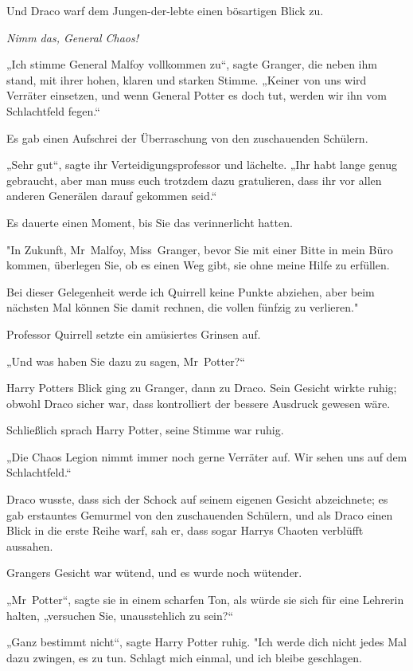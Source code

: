 {Und Draco warf dem Jungen-der-lebte einen bösartigen Blick zu.

\emph{Nimm das, General Chaos!}

„Ich stimme General Malfoy vollkommen zu“, sagte Granger, die neben ihm stand, mit ihrer hohen, klaren und starken Stimme. „Keiner von uns wird Verräter einsetzen, und wenn General Potter es doch tut, werden wir ihn vom Schlachtfeld fegen.“

Es gab einen Aufschrei der Überraschung von den zuschauenden Schülern.

„Sehr gut“, sagte ihr Verteidigungsprofessor und lächelte. „Ihr habt lange genug gebraucht, aber man muss euch trotzdem dazu gratulieren, dass ihr vor allen anderen Generälen darauf gekommen seid.“

Es dauerte einen Moment, bis Sie das verinnerlicht hatten.

"In Zukunft, Mr~Malfoy, Miss~Granger, bevor Sie mit einer Bitte in mein Büro kommen, überlegen Sie, ob es einen Weg gibt, sie ohne meine Hilfe zu erfüllen.

Bei dieser Gelegenheit werde ich Quirrell keine Punkte abziehen, aber beim nächsten Mal können Sie damit rechnen, die vollen fünfzig zu verlieren."

Professor Quirrell setzte ein amüsiertes Grinsen auf.

„Und was haben Sie dazu zu sagen, Mr~Potter?“

Harry Potters Blick ging zu Granger, dann zu Draco. Sein Gesicht wirkte ruhig; obwohl Draco sicher war, dass kontrolliert der bessere Ausdruck gewesen wäre.

Schließlich sprach Harry Potter, seine Stimme war ruhig.

„Die Chaos Legion nimmt immer noch gerne Verräter auf. Wir sehen uns auf dem Schlachtfeld.“

Draco wusste, dass sich der Schock auf seinem eigenen Gesicht abzeichnete; es gab erstauntes Gemurmel von den zuschauenden Schülern, und als Draco einen Blick in die erste Reihe warf, sah er, dass sogar Harrys Chaoten verblüfft aussahen.

Grangers Gesicht war wütend, und es wurde noch wütender.

„Mr~Potter“, sagte sie in einem scharfen Ton, als würde sie sich für eine Lehrerin halten, „versuchen Sie, unausstehlich zu sein?“

„Ganz bestimmt nicht“, sagte Harry Potter ruhig. "Ich werde dich nicht jedes Mal dazu zwingen, es zu tun. Schlagt mich einmal, und ich bleibe geschlagen.

}
